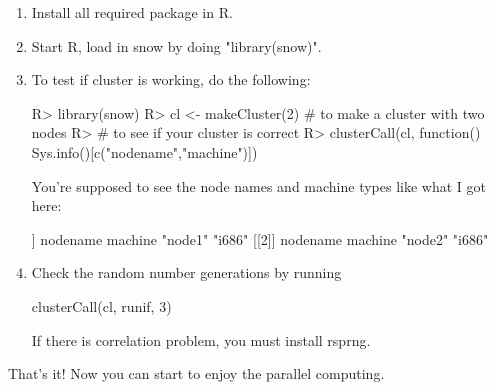 \begin{enumerate}
\item Install all required package in R. 
\item Start R, load in snow by doing "library(snow)".
\item To test if cluster is working, do the following:\\
\begin{Sinput}
R> library(snow)
R> cl <- makeCluster(2) # to make a cluster with two nodes
R> # to see if your cluster is correct
R> clusterCall(cl, function() Sys.info()[c("nodename","machine")])
\end{Sinput}
You're supposed to see the node names and machine
types like what I got here:
\begin{Sinput}
[[1]]
nodename               machine
"node1"                "i686"
[[2]]
nodename           machine
"node2"            "i686"
\end{Sinput}

\item Check the random number generations by running 
\begin{Sinput}
clusterCall(cl, runif, 3)
\end{Sinput}
If there is correlation 
problem, you must install rsprng.
\end{enumerate}

That's it! Now you can start to enjoy the parallel computing.

